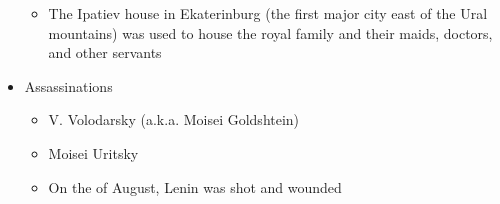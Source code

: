 \begin{itemize}
\begin{itemize}
      \item The Ipatiev house in Ekaterinburg (the first major city east of the Ural mountains) was used to house the royal family and their maids, doctors, and other servants

    \end{itemize}

  \item Assassinations

    \begin{itemize}

      \item V. Volodarsky (a.k.a. Moisei Goldshtein)

      \item Moisei Uritsky

      \item On the  of August, Lenin was shot and wounded

    \end{itemize}

\end{itemize}



